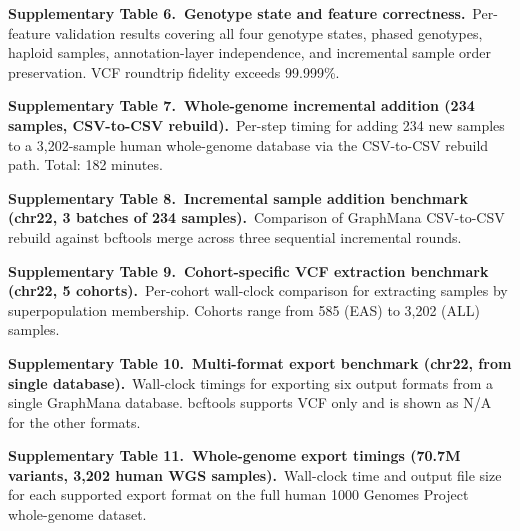 \documentclass[11pt,a4paper]{article}
\begin{document}
\vspace{0.8em}

\noindent\textbf{Supplementary Table 6.~Genotype state and feature correctness.}~Per-feature validation results covering all four genotype states, phased genotypes, haploid samples, annotation-layer independence, and incremental sample order preservation. VCF roundtrip fidelity exceeds 99.999\%.

\vspace{0.8em}

\noindent\textbf{Supplementary Table 7.~Whole-genome incremental addition (234 samples, CSV-to-CSV rebuild).}~Per-step timing for adding 234 new samples to a 3,202-sample human whole-genome database via the CSV-to-CSV rebuild path. Total: 182 minutes.

\vspace{0.8em}

\noindent\textbf{Supplementary Table 8.~Incremental sample addition benchmark (chr22, 3 batches of 234 samples).}~Comparison of GraphMana CSV-to-CSV rebuild against bcftools merge across three sequential incremental rounds.

\vspace{0.8em}

\noindent\textbf{Supplementary Table 9.~Cohort-specific VCF extraction benchmark (chr22, 5 cohorts).}~Per-cohort wall-clock comparison for extracting samples by superpopulation membership. Cohorts range from 585 (EAS) to 3,202 (ALL) samples.

\vspace{0.8em}

\noindent\textbf{Supplementary Table 10.~Multi-format export benchmark (chr22, from single database).}~Wall-clock timings for exporting six output formats from a single GraphMana database. bcftools supports VCF only and is shown as N/A for the other formats.

\vspace{0.8em}

\noindent\textbf{Supplementary Table 11.~Whole-genome export timings (70.7M variants, 3,202 human WGS samples).}~Wall-clock time and output file size for each supported export format on the full human 1000 Genomes Project whole-genome dataset.

\vspace{0.8em}

\newpage

\end{document}
